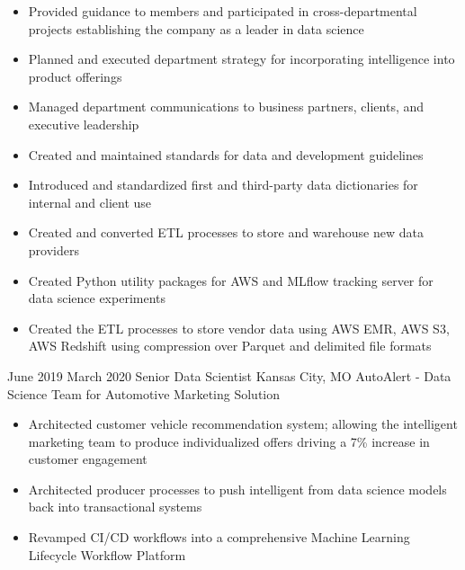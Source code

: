 {
    \begin{itemize}
        \item Provided guidance to members and participated in
        cross-departmental projects establishing the company as a leader in data
        science
        \item Planned and executed department strategy for incorporating
        intelligence into product offerings
        \item Managed department communications to business partners, clients,
        and executive leadership
        \item Created and maintained standards for data and development
        guidelines
        \item Introduced and standardized first and third-party data
        dictionaries for internal and client use
        \item Created and converted ETL processes to store and warehouse new
        data providers
        \item Created Python utility packages for AWS and MLflow tracking server
        for data science experiments
        \item Created the ETL processes to store vendor data using AWS EMR, AWS
        S3, AWS Redshift using compression over Parquet and delimited file
        formats
    \end{itemize}
}

\vspace*{0.1 in}

\ProjectExperienceOneSection
{June 2019}
{March 2020}
{Senior Data Scientist}
{Kansas City, MO}
{AutoAlert - Data Science Team for Automotive Marketing Solution}
{
    \begin{itemize}
        \item Architected customer vehicle recommendation system; allowing the
        intelligent marketing team to produce individualized offers driving a
        7\% increase in customer engagement
        \item Architected producer processes to push intelligent from data
        science models back into transactional systems
        \item Revamped CI/CD workflows into a comprehensive Machine Learning
        Lifecycle Workflow Platform
    \end{itemize}
}
